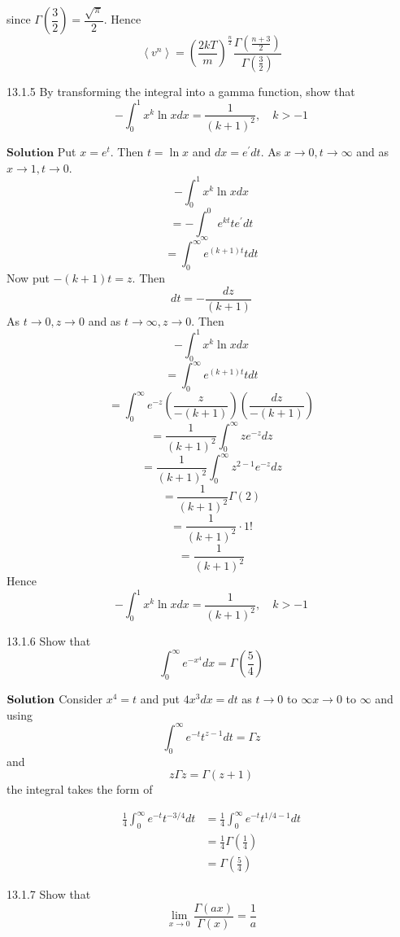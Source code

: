 \documentclass{styles/kaobook}
\begin{document}
since $\Gamma\left(\dfrac{3}{2}\right)=\dfrac{\sqrt{\pi}}{2}$. Hence 
$$\left\langle v^{n}\right\rangle=\left(\dfrac{2 k T}{m}\right)^{\frac{n}{2}} \frac{\Gamma\left(\frac{n+3}{2}\right)}{\Gamma\left(\frac{3}{2}\right)}$$



\begin{greenbox}{13.1.5}
By transforming the integral into a gamma function, show that
$$
-\int_{0}^{1} x^{k} \ln x d x=\frac{1}{(k+1)^{2}}, \quad k>-1
$$
\end{greenbox}

$\boxed{\textbf{Solution}}$ Put $x=e^{t} .$ Then $t=\ln x$ and $d x=e^{\prime} d t$. As $x \rightarrow 0, t \rightarrow \infty$ and as $x \rightarrow 1, t \rightarrow 0$.
$$-\int_{0}^{1} x^{k} \ln x d x$$
$$=-\int_{\infty}^{0} e^{k t} t e^{\prime} d t$$
$$=\int_{0}^{\infty} e^{(k+1) t} t d t$$
Now put $-(k+1) t=z .$ Then 
$$d t=-\frac{d z}{(k+1)} $$
As $t \rightarrow 0, z \rightarrow 0$ and as $t \rightarrow \infty, z \rightarrow 0$. Then
$$-\int_{0}^{1} x^{k} \ln x d x$$
$$=\int_{0}^{\infty} e^{(k+1) t} t d t$$
$$=\int_{0}^{\infty} e^{-z}\left(\frac{z}{-(k+1)}\right)\left(\frac{d z}{-(k+1)}\right)$$
$$=\frac{1}{(k+1)^{2}} \int_{0}^{\infty} z e^{-z} d z$$
$$=\frac{1}{(k+1)^{2}} \int_{0}^{\infty} z^{2-1} e^{-z} d z$$
$$=\frac{1}{(k+1)^{2}} \Gamma(2)$$
$$=\frac{1}{(k+1)^{2}} \cdot 1 !$$
$$=\frac{1}{(k+1)^{2}}$$
Hence
$$
-\int_{0}^{1} x^{k} \ln x d x=\frac{1}{(k+1)^{2}}, \quad k>-1
$$


\begin{greenbox}{13.1.6}
Show that
$$
\int_{0}^{\infty} e^{-x^{4}} d x=\Gamma\left(\frac{5}{4}\right)
$$
\end{greenbox}

$\textbf{\textbf{Solution}}$ Consider $x^{4}=t$ and put $4x^3 dx = dt$ as $t \rightarrow 0$ to $\infty x \rightarrow 0$ to $\infty$ and using
$$
\int_{0}^{\infty} e^{-t} t^{z-1} d t=\Gamma z
$$
and
$$
z \Gamma z=\Gamma(z+1)
$$
the integral takes the form of

$$\begin{aligned} \frac{1}{4} \int_{0}^{\infty} e^{-t} t^{-3 / 4} d t &=\frac{1}{4} \int_{0}^{\infty} e^{-t} t^{1 / 4-1} d t \\ &=\frac{1}{4} \Gamma\left(\frac{1}{4}\right) \\ &=\Gamma\left(\frac{5}{4}\right) \end{aligned}$$



\begin{greenbox}{13.1.7}
Show that
$$
\lim _{x \rightarrow 0} \frac{\Gamma(a x)}{\Gamma(x)}=\frac{1}{a}
$$
\end{greenbox}
\end{document}
